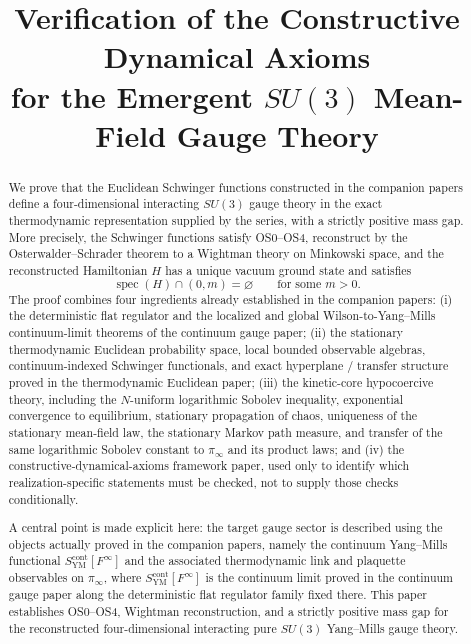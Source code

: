 \documentclass[11pt]{article}
\title{Verification of the Constructive Dynamical Axioms\\
for the Emergent $SU(3)$ Mean-Field Gauge Theory}
\author{}
\date{}
\theoremstyle{definition}
\theoremstyle{remark}
\newcommand{\spec}{\operatorname{spec}}
\begin{document}
\maketitle

\begin{abstract}
We prove that the Euclidean Schwinger functions constructed in the companion papers
define a four-dimensional interacting $SU(3)$ gauge theory in the exact
thermodynamic representation supplied by the series, with a strictly
positive mass gap.
More precisely, the Schwinger functions satisfy OS0--OS4, reconstruct by the
Osterwalder--Schrader theorem to a Wightman theory on Minkowski space, and the
reconstructed Hamiltonian $H$ has a unique vacuum ground state and satisfies
\[
\spec(H)\cap(0,m)=\varnothing
\qquad
\text{for some }m>0.
\]
The proof combines four ingredients already established in the companion papers:
(i) the deterministic flat regulator and the localized and global
Wilson-to-Yang--Mills continuum-limit theorems of the continuum gauge paper;
(ii) the stationary thermodynamic Euclidean probability space, local bounded
observable algebras, continuum-indexed Schwinger functionals, and exact
hyperplane / transfer structure proved in the thermodynamic Euclidean paper;
(iii) the kinetic-core hypocoercive theory, including the $N$-uniform
logarithmic Sobolev inequality, exponential convergence to equilibrium,
stationary propagation of chaos, uniqueness of the stationary mean-field law,
the stationary Markov path measure, and transfer of the same logarithmic
Sobolev constant to $\pi_\infty$ and its product laws; and
(iv) the constructive-dynamical-axioms framework paper, used only to identify
which realization-specific statements must be checked, not to supply those
checks conditionally.

A central point is made explicit here: the target gauge sector is described
using the objects actually proved in the companion papers, namely the
continuum Yang--Mills functional
$S_{\mathrm{YM}}^{\mathrm{cont}}[F^\infty]$ and the associated thermodynamic
link and plaquette observables on $\pi_\infty$, where
$S_{\mathrm{YM}}^{\mathrm{cont}}[F^\infty]$ is the continuum limit proved in
the continuum gauge paper along the deterministic flat regulator family fixed
there.
This paper establishes
OS0--OS4, Wightman reconstruction, and a strictly positive mass gap for the
reconstructed four-dimensional interacting pure $SU(3)$ Yang--Mills gauge
theory.
\end{abstract}
\end{document}
